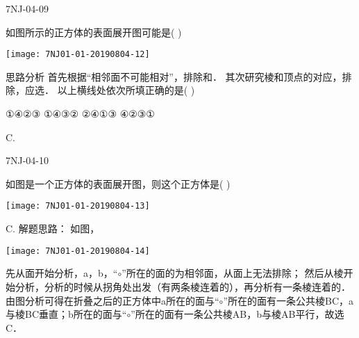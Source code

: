 \begin{defproblem}{7NJ-04-09}%
\begin{onlyproblem}%
如图所示的正方体的表面展开图可能是(    ) 
\begin{center}
\texttt{[image: 7NJ01-01-20190804-12]}
\end{center}

思路分析 首先根据“相邻面不可能相对”，排除\underline{\hspace*{2cm}}和\underline{\hspace*{2cm}}． 其次研究棱和顶点的对应，排除\underline{\hspace*{2cm}}，应选\underline{\hspace*{2cm}}． 以上横线处依次所填正确的是(    ) 


\xx
{①④②③}
{①④③②}
{②④①③}
{④②③①}

\end{onlyproblem}%
\begin{onlysolution}%
\begin{solution}%
C.
\end{solution}%
\end{onlysolution}%
\end{defproblem}




\begin{defproblem}{7NJ-04-10}%
\begin{onlyproblem}%
如图是一个正方体的表面展开图，则这个正方体是(    ) 
\begin{center}
\texttt{[image: 7NJ01-01-20190804-13]}
\end{center}

\end{onlyproblem}%
\begin{onlysolution}%
\begin{solution}%
C.
解题思路： 如图，\begin{center}
\texttt{[image: 7NJ01-01-20190804-14]}
\end{center}
先从面开始分析，a，b，“$\circ$”所在的面的为相邻面，从面上无法排除； 然后从棱开始分析，分析的时候从拐角处出发（有两条棱连着的），再分析有一条棱连着的． 由图分析可得在折叠之后的正方体中a所在的面与“$\circ$”所在的面有一条公共棱BC，a与棱BC垂直；b所在的面与“$\circ$”所在的面有一条公共棱AB，b与棱AB平行，故选C． 
\end{solution}%
\end{onlysolution}%
\end{defproblem}






